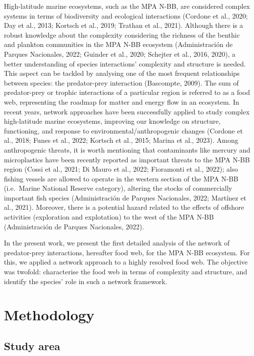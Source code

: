 \documentclass[preprint, 3p,
authoryear]{elsarticle} %
\begin{document}
High-latitude marine ecosystems, such as the MPA N-BB, are considered
complex systems in terms of biodiversity and ecological interactions
(Cordone et al., 2020; Day et al., 2013; Kortsch et al., 2019; Trathan
et al., 2021). Although there is a robust knowledge about the complexity
considering the richness of the benthic and plankton communities in the
MPA N-BB ecosystem (Administración de Parques Nacionales, 2022; Guinder
et al., 2020; Schejter et al., 2016, 2020), a better understanding of
species interactions' complexity and structure is needed. This aspect
can be tackled by analysing one of the most frequent relationships
between species: the predator-prey interaction (Bascompte, 2009). The
sum of predator-prey or trophic interactions of a particular region is
referred to as a food web, representing the roadmap for matter and
energy flow in an ecosystem. In recent years, network approaches have
been successfully applied to study complex high-latitude marine
ecosystems, improving our knowledge on structure, functioning, and
response to environmental/anthropogenic changes (Cordone et al., 2018;
Funes et al., 2022; Kortsch et al., 2015; Marina et al., 2023). Among
anthropogenic threats, it is worth mentioning that contaminants like
mercury and microplastics have been recently reported as important
threats to the MPA N-BB region (Cossi et al., 2021; Di Mauro et al.,
2022; Fioramonti et al., 2022); also fishing vessels are allowed to
operate in the western section of the MPA N-BB (i.e.~Marine National
Reserve category), altering the stocks of commercially important fish
species (Administración de Parques Nacionales, 2022; Martínez et al.,
2021). Moreover, there is a potential hazard related to the effects of
offshore activities (exploration and explotation) to the west of the MPA
N-BB (Administración de Parques Nacionales, 2022).

In the present work, we present the first detailed analysis of the
network of predator-prey interactions, hereafter food web, for the MPA
N-BB ecosystem. For this, we applied a network approach to a highly
resolved food web. The objective was twofold: characterise the food web
in terms of complexity and structure, and identify the species' role in
such a network framework.

\hypertarget{methodology}{%
\section{Methodology}\label{methodology}}

\hypertarget{study-area}{%
\subsection{Study area}\label{study-area}}
\end{document}
